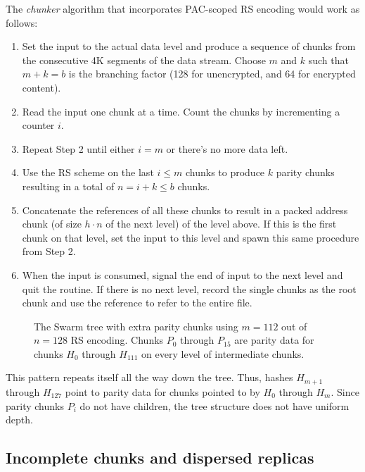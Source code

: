 The \emph{chunker} algorithm that incorporates PAC-scoped RS encoding would work as follows: 

\begin{enumerate}[noitemsep]
\item Set the input to the actual data level and produce a sequence of chunks from the consecutive 4K segments of the data stream. Choose $m$ and $k$ such that $m+k=b$ is the branching factor (128 for unencrypted, and 64 for encrypted content).
\item Read the input one chunk at a time. Count the chunks by incrementing a counter $i$. 
\item Repeat Step 2 until either $i = m$ or there's no more data left.
\item Use the RS scheme on the last $i\leq m$ chunks to produce $k$ parity chunks resulting in a total of $n = i+k \leq b$ chunks.
\item Concatenate the references of all these chunks to result in a packed address chunk (of size $h\cdot n$ of the next level) of the level above. If this is the first chunk on that level,  set the input to this level and spawn this same procedure from Step 2. 
\item When the input is consumed, signal the end of input to the next level and quit the routine. If there is no next level, record the single chunks as the root chunk and use the reference to refer to the entire file.
\end{enumerate}



\begin{figure}[htbp]
   \centering
   \resizebox{1\textwidth}{!}{
        
   }
   \caption[Swarm hash erasure \statusgreen]{The Swarm tree with extra parity chunks using $m=112$ out of $n=128$ RS encoding. Chunks $P_{0}$ through $P_{15}$ are parity data for chunks $H_0 $ through $H_{111}$ on every level of intermediate chunks.}
   \label{fig:Swarm-hash-erasure}
\end{figure}


This pattern repeats itself all the way down the tree. Thus, hashes $H_{m+1}$ through $H_{127}$ point to parity data for chunks pointed to by $H_0$ through $H_{m}$. Since parity chunks $P_i$ do not have children, the tree structure does not have uniform depth.

\subsection{Incomplete chunks and dispersed replicas}
\label{sec:dispersed-replicas}

